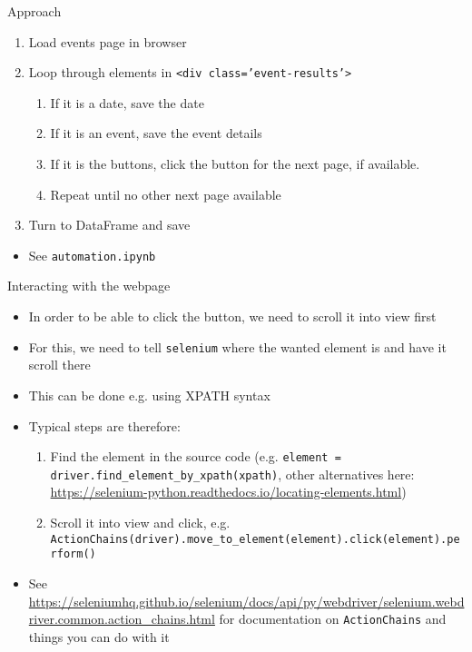 \begin{frame}[fragile]{Approach}
\begin{enumerate}
	\item Load events page in browser
	\item Loop through elements in \texttt{<div class='event-results'>}
	\begin{enumerate}
		\item If it is a date, save the date
		\item If it is an event, save the event details
		\item If it is the buttons, click the button for the next page, if available.
	    \item Repeat until no other next page available
	\end{enumerate}
	\item Turn to DataFrame and save
\end{enumerate}
\begin{itemize}
	\item See \texttt{automation.ipynb}
\end{itemize}
\end{frame}

\begin{frame}[fragile]{Interacting with the webpage}
\begin{itemize}
	\item In order to be able to click the button, we need to scroll it into view first
	\item For this, we need to tell \texttt{selenium} where the wanted element is and have it scroll there
	\item This can be done e.g. using XPATH syntax
	\item Typical steps are therefore:
	\begin{enumerate}
		\item Find the element in the source code (e.g. \texttt{element = driver.find_element_by_xpath(xpath)}, other alternatives here: \url{https://selenium-python.readthedocs.io/locating-elements.html})
		\item Scroll it into view and click, e.g. \texttt{ActionChains(driver).move_to_element(element).click(element).perform()}
	\end{enumerate}
	\item See \url{https://seleniumhq.github.io/selenium/docs/api/py/webdriver/selenium.webdriver.common.action_chains.html} for documentation on \texttt{ActionChains} and things you can do with it 
\end{itemize}
\end{frame}

